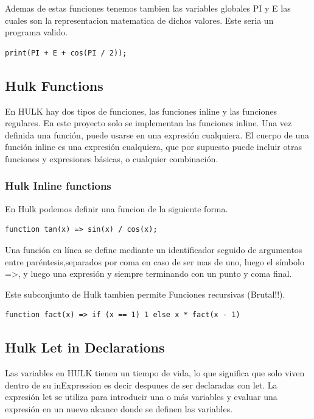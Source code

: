 \documentclass[a4paper, 12pt]{report}
\begin{document}
Ademas de estas funciones tenemos tambien las variables globales PI y E las cuales son la representacion matematica de dichos valores.
Este seria un programa valido.
\begin{lstlisting}
print(PI + E + cos(PI / 2));
\end{lstlisting}

\subsection*{Hulk Functions}

En HULK hay dos tipos de funciones, las funciones inline y las funciones regulares. En este proyecto solo se implementan las funciones inline. Una vez definida una función, puede usarse en una expresión cualquiera. El cuerpo de una función inline es una expresión cualquiera, que por supuesto puede incluir otras funciones y expresiones básicas, o cualquier combinación.

\subsubsection*{Hulk Inline functions}
En Hulk podemos definir una funcion de la siguiente forma.
\begin{lstlisting}
function tan(x) => sin(x) / cos(x);
\end{lstlisting}

Una función en línea se define mediante un identificador seguido de argumentos entre paréntesis,separados por coma en caso de ser mas de uno,
luego el símbolo =>, y luego una expresión y siempre
terminando con un punto y coma final.

Este subconjunto de Hulk tambien permite Funciones recursivas (Brutal!!).
\begin{lstlisting}
function fact(x) => if (x == 1) 1 else x * fact(x - 1)
\end{lstlisting}

\subsection*{Hulk Let in Declarations}

Las variables en HULK tienen un tiempo de vida, lo que significa que solo viven dentro de su inExpression es decir despuues de ser declaradas con let. 
La expresión let se utiliza para introducir una o más variables y evaluar una expresión en
un nuevo alcance donde se definen las variables.
\end{document}
